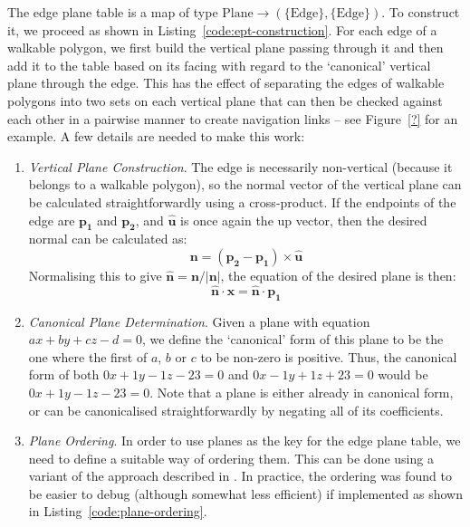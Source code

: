 \documentclass[10pt,twocolumn]{article}
\begin{document}
The edge plane table is a map of type $\mbox{Plane} \to (\{\mbox{Edge}\},\{\mbox{Edge}\})$. To construct it, we proceed as shown in Listing~\ref{code:ept-construction}. For each edge of a walkable polygon, we first build the vertical plane passing through it and then add it to the table based on its facing with regard to the `canonical' vertical plane through the edge. This has the effect of separating the edges of walkable polygons into two sets on each vertical plane that can then be checked against each other in a pairwise manner to create navigation links -- see Figure~\ref{?} for an example. A few details are needed to make this work:
%
\begin{enumerate}

\item \emph{Vertical Plane Construction}. The edge is necessarily non-vertical (because it belongs to a walkable polygon), so the normal vector of the vertical plane can be calculated straightforwardly using a cross-product. If the endpoints of the edge are $\mathbf{p_1}$ and $\mathbf{p_2}$, and $\mathbf{\hat{u}}$ is once again the up vector, then the desired normal can be calculated as:
%
\[
\mathbf{n} = (\mathbf{p_2} - \mathbf{p_1}) \times \mathbf{\hat{u}}
\]
%
Normalising this to give $\mathbf{\hat{n}} = \mathbf{n} / \left|\mathbf{n}\right|$, the equation of the desired plane is then:
%
\[
\mathbf{\hat{n}} \cdot \mathbf{x} = \mathbf{\hat{n}} \cdot \mathbf{p_1}
\]

\item \emph{Canonical Plane Determination}. Given a plane with equation $ax + by + cz - d = 0$, we define the `canonical' form of this plane to be the one where the first of $a$, $b$ or $c$ to be non-zero is positive. Thus, the canonical form of both $0x + 1y - 1z - 23 = 0$ and $0x - 1y + 1z + 23 = 0$ would be $0x + 1y - 1z - 23 = 0$. Note that a plane is either already in canonical form, or can be canonicalised straightforwardly by negating all of its coefficients.

\item \emph{Plane Ordering}. In order to use planes as the key for the edge plane table, we need to define a suitable way of ordering them. This can be done using a variant of the approach described in \cite{salesin92}. In practice, the ordering was found to be easier to debug (although somewhat less efficient) if implemented as shown in Listing~\ref{code:plane-ordering}.

\end{enumerate}
\end{document}
